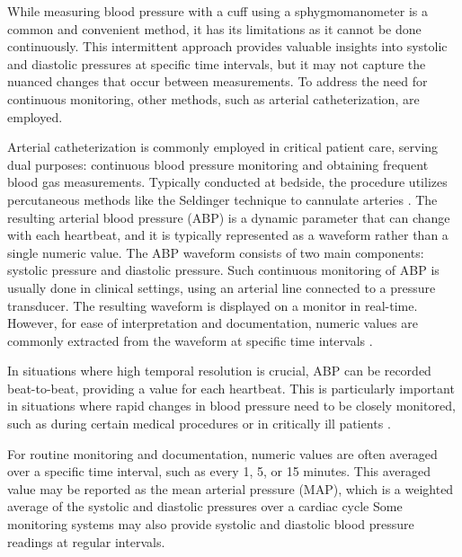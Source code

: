 \documentclass[12pt, bibliography=totoc]{scrartcl}
\begin{document}
While measuring blood pressure with a cuff using a sphygmomanometer is a common and convenient method, it has its limitations as it cannot be done continuously. This intermittent approach provides valuable insights into systolic and diastolic pressures at specific time intervals, but it may not capture the nuanced changes that occur between measurements. To address the need for continuous monitoring, other methods, such as arterial catheterization, are employed. 

Arterial catheterization is commonly employed in critical patient care, serving dual purposes: continuous blood pressure monitoring and obtaining frequent blood gas measurements. Typically conducted at bedside, the procedure utilizes percutaneous methods like the Seldinger technique to cannulate arteries \cite{clarkArterialCatheterization1992}.
The resulting arterial blood pressure (ABP) is a dynamic parameter that can change with each heartbeat, and it is typically represented as a waveform rather than a single numeric value.
The ABP waveform consists of two main components: systolic pressure and diastolic pressure.
Such continuous monitoring of ABP is usually done in clinical settings, using an arterial line connected to a pressure transducer. The resulting waveform is displayed on a monitor in real-time.
However, for ease of interpretation and documentation, numeric values are commonly extracted from the waveform at specific time intervals \cite{hillImputationContinuousArterial2021}.

In situations where high temporal resolution is crucial, ABP can be recorded beat-to-beat, providing a value for each heartbeat.
This is particularly important in situations where rapid changes in blood pressure need to be closely monitored, such as during certain medical procedures or in critically ill patients \cite{lehmanMethodsBloodPressure2013}.

For routine monitoring and documentation, numeric values are often averaged over a specific time interval, such as every 1, 5, or 15 minutes.
This averaged value may be reported as the mean arterial pressure (MAP), which is a weighted average of the systolic and diastolic pressures over a cardiac cycle \cite{demersPhysiologyMeanArterial2024}
Some monitoring systems may also provide systolic and diastolic blood pressure readings at regular intervals.
\end{document}
